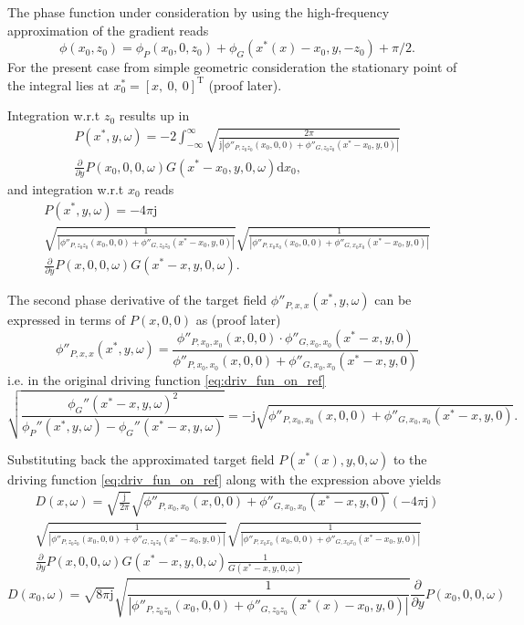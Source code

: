 \documentclass[12pt,a4paper]{article}
\newcommand{\td}{\mathrm{d}}
\newcommand{\ti}{\mathrm{j}}
\begin{document}
The phase function under consideration by using the high-frequency approximation of the gradient reads
\begin{equation}
\phi(x_0,z_0) = \phi_P(x_0,0,z_0) + \phi_G(x^*(x) - x_0,y,-z_0)+ \pi/2.
\end{equation}
For the present case from simple geometric consideration the stationary point of the integral lies at $x_0^{*} = [x,\ 0,\ 0]^{\mathrm{T}}$ (proof later).

Integration w.r.t $z_0$ results up in
\begin{multline}
P(x^*,y,\omega) = -2\int_{-\infty}^{\infty} 
\sqrt{\frac{2\pi}{\ti |\phi''_{P,z_0 z_0}(x_0,0,0) + \phi''_{G,z_0 z_0}(x^* - x_0,y,0)|}}
 \\
\frac{\partial}{\partial y} P(x_0,0,0,\omega) G(x^*-x_0,y,0,\omega) \td x_0,
\end{multline}
and integration w.r.t $x_0$ reads
\begin{multline}
P(x^*,y,\omega) = -4\pi\ti\\
\sqrt{\frac{1}{ |\phi''_{P,z_0 z_0}(x_0,0,0) + \phi''_{G,z_0 z_0}(x^* - x_0,y,0)|}}
\sqrt{\frac{1}{ |\phi''_{P,x_0 x_0}(x_0,0,0) + \phi''_{G,x_0 x_0}(x^* - x_0,y,0)|}}
 \\
\frac{\partial}{\partial y} P(x,0,0,\omega) G(x^*-x,y,0,\omega).
\end{multline}

The second phase derivative of the target field $\phi''_{P,x,x}(x^*,y,\omega)$ can be expressed in terms of $P(x,0,0)$ as (proof later)
\begin{equation}
\phi''_{P,x,x}(x^*,y,\omega) = \frac{\phi''_{P,x_0,x_0}(x,0,0) \cdot \phi''_{G,x_0,x_0}(x^* - x,y,0)}{\phi''_{P,x_0,x_0}(x,0,0) + \phi''_{G,x_0,x_0}(x^* - x,y,0)}
\end{equation}
i.e. in the original driving function \eqref{eq:driv_fun_on_ref}
\begin{equation}
\sqrt{\frac{\phi_G''(x^*- x,y,\omega)^2}{\phi_P''(x^*,y,\omega) - \phi_G''(x^*- x,y,\omega)}} = -\ti\sqrt{\phi''_{P,x_0,x_0}(x,0,0) + \phi''_{G,x_0,x_0}(x^* - x,y,0)}.
\end{equation}

Substituting back the approximated target field $P(x^*(x),y,0,\omega)$ to the driving function \eqref{eq:driv_fun_on_ref} along with the expression above yields
\begin{multline}
D(x,\omega) = 
\sqrt{\frac{\ti}{2\pi}}
\sqrt{\phi''_{P,x_0,x_0}(x,0,0) + \phi''_{G,x_0,x_0}(x^* - x,y,0)}
(-4\pi\ti)\\
\sqrt{\frac{1}{ |\phi''_{P,z_0 z_0}(x_0,0,0) + \phi''_{G,z_0 z_0}(x^* - x_0,y,0)|}}
\sqrt{\frac{1}{ |\phi''_{P,x_0 x_0}(x_0,0,0) + \phi''_{G,x_0 x_0}(x^* - x_0,y,0)|}}
 \\
\frac{\partial}{\partial y} P(x,0,0,\omega) G(x^*-x,y,0,\omega)
\frac{ 1 }{G(x^*- x,y,0,\omega) }
\end{multline}
\begin{equation}
D(x_0,\omega) = 
\sqrt{8\pi \ti }
\sqrt{\frac{1}{ |\phi''_{P,z_0 z_0}(x_0,0,0) + \phi''_{G,z_0 z_0}(x^*(x) - x_0,y,0)|}}
\frac{\partial}{\partial y} P(x_0,0,0,\omega)
\end{equation}
\end{document}
